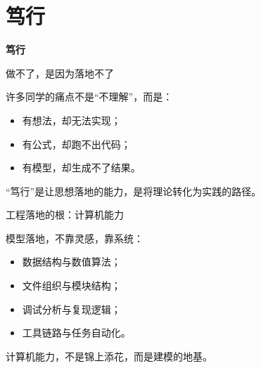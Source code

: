 \section{笃行}



\begin{frame}[plain]
  \centering
  \vspace{3.5cm}
  {\color{steelwhite}\Huge\bfseries 笃行}
\end{frame}

\begin{frame}{\color{steelwhite}做不了，是因为落地不了}
\justifying
{\color{textblack}
许多同学的痛点不是“不理解”，而是：

\vspace{0.5em}
\begin{itemize}
  \item 有想法，却无法实现；
  \item 有公式，却跑不出代码；
  \item 有模型，却生成不了结果。
\end{itemize}

\vspace{0.5em}
“笃行”是让思想落地的能力，是将理论转化为实践的路径。
}
\end{frame}

\begin{frame}{\color{steelwhite}工程落地的根：计算机能力}
\justifying
{\color{textblack}
模型落地，不靠灵感，靠系统：

\vspace{0.5em}
\begin{itemize}
  \item 数据结构与数值算法；
  \item 文件组织与模块结构；
  \item 调试分析与复现逻辑；
  \item 工具链路与任务自动化。
\end{itemize}

\vspace{0.5em}
计算机能力，不是锦上添花，而是建模的地基。
}
\end{frame}

